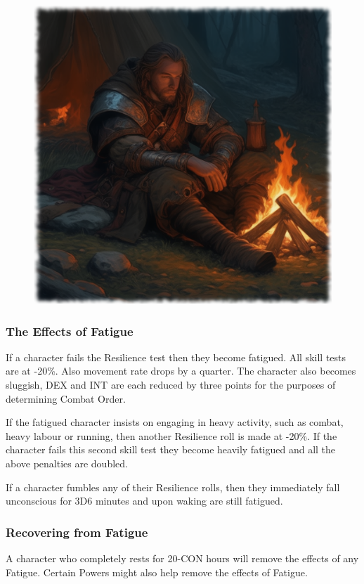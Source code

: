 \begin{figure}%
\begin{center}
\includegraphics[scale=0.24]{img/ai-images/fatigue.png}
\end{center}
\end{figure}


\subsubsection{The Effects of Fatigue}
If a character fails the Resilience test then they become fatigued. All skill tests are at -20\%. Also movement rate drops by a quarter. The character also becomes sluggish, DEX and INT are each reduced by three points for the purposes of determining Combat Order.

If the fatigued character insists on engaging in heavy activity, such as combat, heavy labour or running, then another Resilience roll is made at -20\%. If the character fails this second skill test they become heavily fatigued and all the above penalties are doubled.

If a character fumbles any of their Resilience rolls, then they immediately fall unconscious for 3D6 minutes and upon waking are still fatigued.

\subsubsection{Recovering from Fatigue}
A character who completely rests for 20-CON hours will remove the effects of any Fatigue. Certain Powers might also help remove the effects of Fatigue.


